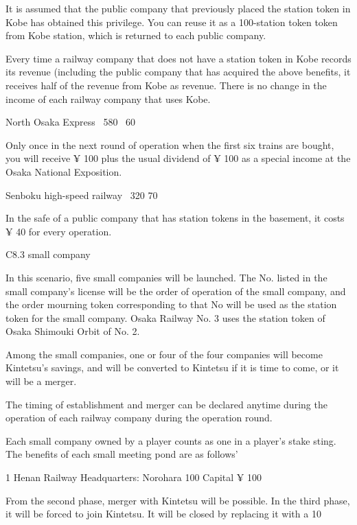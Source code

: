 \documentclass{article}
\begin{document}
\begin{CJK}{UTF8}{min}
It is assumed that the public company that previously placed the station token in Kobe has obtained this privilege. You can reuse it as a 100-station token token from Kobe station, which is returned to each public company.

Every time a railway company that does not have a station token in Kobe records its revenue (including the public company that has acquired the above benefits, it receives half of the revenue from Kobe as revenue. There is no change in the income of each railway company that uses Kobe.

North Osaka Express \ 580 \ 60

Only once in the next round of operation when the first six trains are bought, you will receive ¥ 100 plus the usual dividend of ¥ 100 as a special income at the Osaka National Exposition.

Senboku high-speed railway \ 320 70

In the safe of a public company that has station tokens in the basement, it costs ¥ 40 for every operation.

C8.3 small company

In this scenario, five small companies will be launched. The No. listed in the small company's license will be the order of operation of the small company, and the order mourning token corresponding to that No will be used as the station token for the small company. Osaka Railway No. 3 uses the station token of Osaka Shimouki Orbit of No. 2.

Among the small companies, one or four of the four companies will become Kintetsu's savings, and will be converted to Kintetsu if it is time to come, or it will be a merger.

The timing of establishment and merger can be declared anytime during the operation of each railway company during the operation round.

Each small company owned by a player counts as one in a player's stake sting. The benefits of each small meeting pond are as follows'

1 Henan Railway Headquarters: Norohara 100 Capital ¥ 100

From the second phase, merger with Kintetsu will be possible. In the third phase, it will be forced to join Kintetsu. It will be closed by replacing it with a 10%


\end{CJK}
\end{document}
